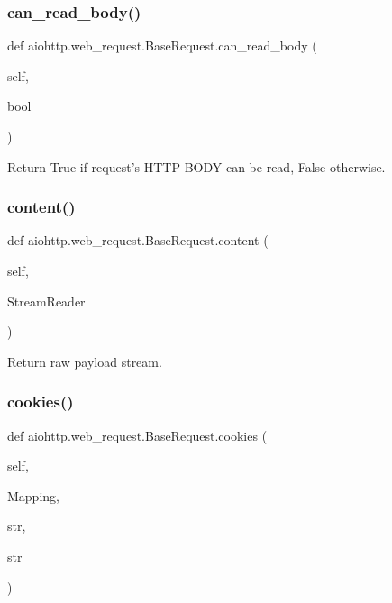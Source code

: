 \subsubsection{\texorpdfstring{can\+\_\+read\+\_\+body()}{can\_read\_body()}}
{\footnotesize\ttfamily def aiohttp.\+web\+\_\+request.\+Base\+Request.\+can\+\_\+read\+\_\+body (\begin{DoxyParamCaption}\item[{}]{self,  }\item[{}]{bool }\end{DoxyParamCaption})}

\begin{DoxyVerb}Return True if request's HTTP BODY can be read, False otherwise.\end{DoxyVerb}
 \mbox{\label{classaiohttp_1_1web__request_1_1_base_request_a06d0a5b5a87ca2ad73a166ba8d49f577}} 
\subsubsection{\texorpdfstring{content()}{content()}}
{\footnotesize\ttfamily def aiohttp.\+web\+\_\+request.\+Base\+Request.\+content (\begin{DoxyParamCaption}\item[{}]{self,  }\item[{}]{Stream\+Reader }\end{DoxyParamCaption})}

\begin{DoxyVerb}Return raw payload stream.\end{DoxyVerb}
 \mbox{\label{classaiohttp_1_1web__request_1_1_base_request_afe8b11231c367ef5be69e167af326956}} 
\subsubsection{\texorpdfstring{cookies()}{cookies()}}
{\footnotesize\ttfamily def aiohttp.\+web\+\_\+request.\+Base\+Request.\+cookies (\begin{DoxyParamCaption}\item[{}]{self,  }\item[{}]{Mapping,  }\item[{}]{str,  }\item[{}]{str }\end{DoxyParamCaption})}

